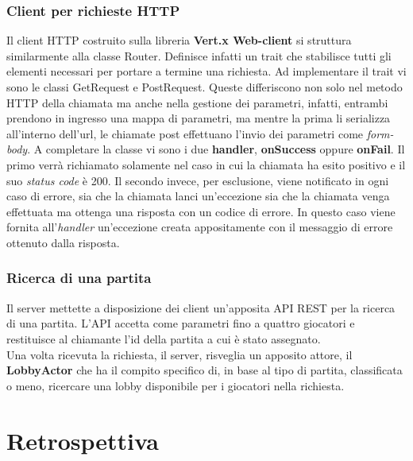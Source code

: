 	\subsubsection{Client per richieste HTTP}
	  Il client HTTP costruito sulla libreria \textbf{Vert.x Web-client} si struttura similarmente alla classe Router. Definisce infatti un trait che stabilisce tutti gli elementi necessari per portare a termine una richiesta. 
	  Ad implementare il trait vi sono le classi GetRequest e PostRequest. Queste differiscono non solo nel metodo HTTP della chiamata ma anche nella gestione dei parametri, infatti, entrambi prendono in ingresso una mappa di parametri, ma mentre la prima li serializza all'interno dell'url, le chiamate post effettuano l'invio dei parametri come \textit{form-body}.
	  A completare la classe vi sono i due \textbf{handler}, \textbf{onSuccess} oppure \textbf{onFail}. Il primo verrà richiamato solamente nel caso in cui la chiamata ha esito positivo e il suo \textit{status code} è 200. Il secondo invece, per esclusione, viene notificato in ogni caso di errore, sia che la chiamata lanci un'eccezione sia che la chiamata venga effettuata ma ottenga una risposta con un codice di errore. In questo caso viene fornita all'\textit{handler} un'eccezione creata appositamente con il messaggio di errore ottenuto dalla risposta. 
	  
        \subsubsection{Ricerca di una partita}
          Il server mettette a disposizione dei client un'apposita API REST per la ricerca di una partita. L'API accetta come parametri fino a quattro giocatori e restituisce al chiamante l'id della partita a cui è stato assegnato.
          \\
          Una volta ricevuta la richiesta, il server, risveglia un apposito attore, il \textbf{LobbyActor} che ha il compito specifico di, in base al tipo di partita, classificata o meno, ricercare una lobby disponibile per i giocatori nella richiesta. 
      \clearpage
        
    \section{Retrospettiva}\label{sec:retrospective}


